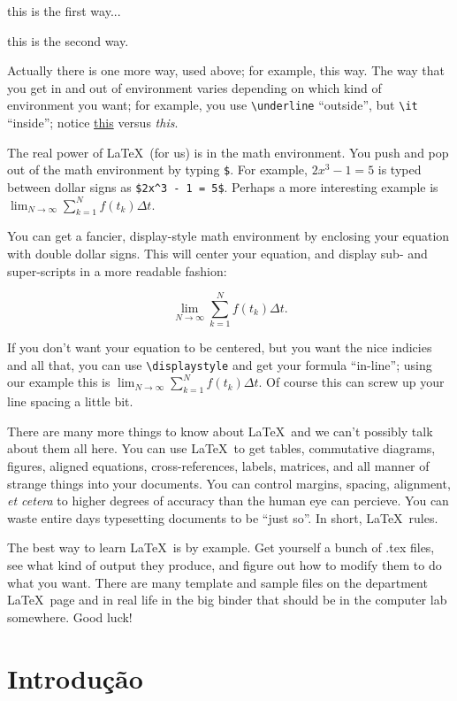 \documentclass{article}
\begin{document}
\centerline{this is the first way...}

\begin{center}
	this is the second way.
\end{center}

\noindent Actually there is one more way, used above; for example, 
{\sc this way}.  The way that you get in and out of environment varies
depending on which kind of environment you want; for example, you use 
\verb|\underline| ``outside'', but \verb|\it| ``inside''; 
notice \underline{this} versus {\it this}.

The real power of \LaTeX\ (for us) is in the math environment. You 
push and pop out of the math environment by typing \verb|$|. For 
example, $2x^3 - 1 = 5$ is typed between dollar signs as
\verb|$2x^3 - 1 = 5$|. Perhaps a more interesting example is
$\lim_{N \to \infty} \sum_{k=1}^N f(t_k) \Delta t$.

You can get a fancier, display-style math 
environment by enclosing your equation with double dollar signs.  
This will center your equation, and display sub- and super-scripts in 
a more readable fashion:

$$\lim_{N \to \infty} \sum_{k=1}^N f(t_k) \Delta t.$$

If you don't want your equation to be centered, but you want the nice 
indicies and all that, you can use \verb|\displaystyle| and get your 
formula ``in-line''; using our example this is 
$\displaystyle \lim_{N \to \infty} \sum_{k=1}^N f(t_k) \Delta t.$  Of 
course this can screw up your line spacing a little bit.

There are many more things to know about \LaTeX\ and we can't 
possibly talk about them all here.
You can use \LaTeX\ to get tables, commutative diagrams, figures, 
aligned equations, cross-references, labels, matrices, and all manner 
of strange things into your documents.  You can control margins, 
spacing, alignment, {\it et cetera} to higher degrees of accuracy than 
the human eye can percieve.  You can waste entire days typesetting 
documents to be ``just so''.  In short, \LaTeX\ rules.

The best way to learn \LaTeX\ is by example. Get yourself a bunch
of .tex files, see what kind of output they produce, and figure out how
to modify them to do what you want.  There are many template and 
sample files on the department \LaTeX\ page and in real life in the 
big binder that should be in the computer lab somewhere.  Good luck!

\section{Introdução}
\end{document}
